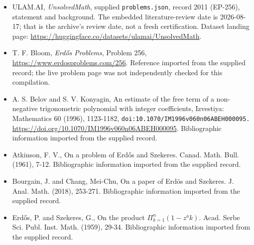 \documentclass[11pt,a4paper]{article}
\begin{document}
{\small

\begin{itemize}

\item[\hypertarget{source:2011:1}{S1}] ULAM.AI, \emph{UnsolvedMath}, supplied \texttt{problems.json}, record 2011 (EP-256), statement and background. The embedded literature-review date is 2026-08-17; that is the archive’s review date, not a fresh certification. Dataset landing page: \url{https://huggingface.co/datasets/ulamai/UnsolvedMath}.

\item[\hypertarget{source:2011:2}{S2}] T. F. Bloom, \emph{Erdős Problems}, Problem 256, \url{https://www.erdosproblems.com/256}. Reference imported from the supplied record; the live problem page was not independently checked for this compilation.

\item[\hypertarget{source:2011:3}{S3}] A. S. Belov and S. V. Konyagin, An estimate of the free term of a non-negative trigonometric polynomial with integer coefficients, Izvestiya: Mathematics 60 (1996), 1123-1182, \nolinkurl{doi:10.1070/IM1996v060n06ABEH000095.} \url{https://doi.org/10.1070/IM1996v060n06ABEH000095}. Bibliographic information imported from the supplied record.

\item[\hypertarget{source:2011:4}{S4}] Atkinson, F. V., On a problem of Erd\H{o}s and Szekeres. Canad. Math. Bull. (1961), 7-12. Bibliographic information imported from the supplied record.

\item[\hypertarget{source:2011:5}{S5}] Bourgain, J. and Chang, Mei-Chu, On a paper of Erd\"{o}s and Szekeres. J. Anal. Math. (2018), 253-271. Bibliographic information imported from the supplied record.

\item[\hypertarget{source:2011:6}{S6}] Erd\H{o}s, P. and Szekeres, G., On the product $\Pi^n_{k=1}(1-z^ak)$. Acad. Serbe Sci. Publ. Inst. Math. (1959), 29-34. Bibliographic information imported from the supplied record.

\end{itemize}

}

\label{end:2011}
\end{document}
